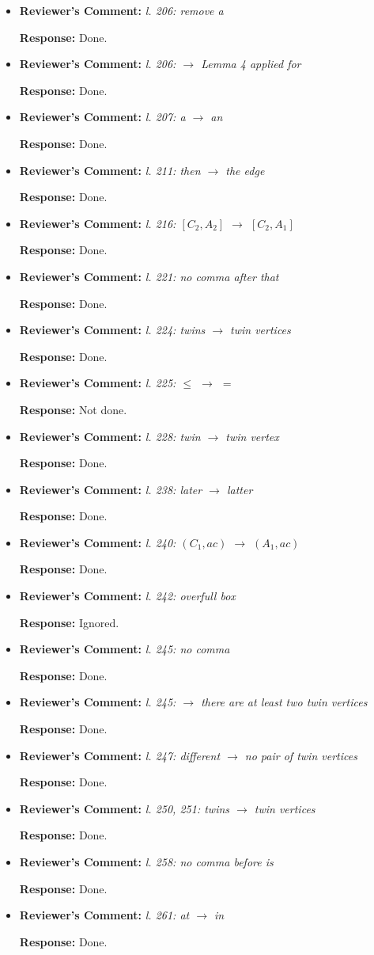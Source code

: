 \documentclass{article}
\newcommand{\rcomment}[1]{\vspace{0.3cm} \item \textbf{Reviewer's Comment:} {\em #1}}
\newcommand{\response}{\vspace{0.2cm} \textbf{Response: }}
\begin{document}
\begin{itemize}
{\begin{itemize}
\rcomment{l. 206: remove a}

\response{Done.}

\rcomment{l. 206: $\rightarrow$ Lemma 4 applied for}

\response{Done.}

\rcomment{l. 207: a $\rightarrow$ an}

\response{Done.}

\rcomment{l. 211: then $\rightarrow$ the edge}

\response{Done.}

\rcomment{l. 216: $[C_2,A_2]$ $\rightarrow$ $[C_2,A_1]$}

\response{Done.}

\rcomment{l. 221: no comma after that}

\response{Done.}

\rcomment{l. 224: twins $\rightarrow$ twin vertices}

\response{Done.}

\rcomment{l. 225: $\leq$ $\rightarrow$ $=$}

\response{Not done.}

\rcomment{l. 228: twin $\rightarrow$ twin vertex}

\response{Done.}

\rcomment{l. 238: later $\rightarrow$ latter}

\response{Done.}

\rcomment{l. 240: $(C_1,ac)$ $\rightarrow$ $(A_1,ac)$}

\response{Done.}

\rcomment{l. 242: overfull box}

\response{Ignored.}

\rcomment{l. 245: no comma}

\response{Done.}

\rcomment{l. 245: $\rightarrow$ there are at least two twin vertices}

\response{Done.}

\rcomment{l. 247: different $\rightarrow$ no pair of twin vertices}

\response{Done.}

\rcomment{l. 250, 251: twins $\rightarrow$ twin vertices}

\response{Done.}

\rcomment{l. 258: no comma before is}

\response{Done.}

\rcomment{l. 261: at $\rightarrow$ in}

\response{Done.}


\end{itemize}}
\end{itemize}
\end{document}
